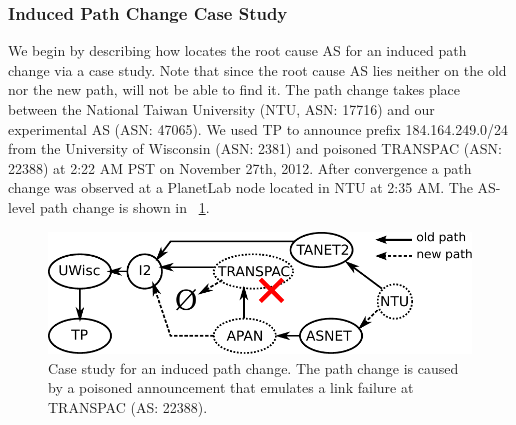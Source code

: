\subsubsection{Induced Path Change Case Study}

We begin by describing how \ouralgo locates the root cause AS for an induced path
change via a case study. Note that since the root cause AS lies neither on the old nor the 
new path,  \feldmann will not be able to find it. The path change takes place between the National Taiwan University
(NTU, ASN: 17716) and our experimental AS (ASN: 47065). We used TP to announce prefix
184.164.249.0/24 from the University of Wisconsin (ASN: 2381)
and poisoned TRANSPAC (ASN: 22388) at 2:22 AM PST on November 27th, 2012. After convergence a path change was observed at a PlanetLab node located in 
NTU at 2:35 AM. The AS-level path change is shown in \fig~\ref{fig:case-study}.

\begin{figure}[tb]
\centering\includegraphics[width=\columnwidth]{figs/case-study.pdf}
\vspace{-1.2em}
\caption{Case study for an induced path change. The path change is caused by
a poisoned announcement that emulates a link failure at TRANSPAC (AS: 22388).}
\label{fig:case-study}
\vspace{.7em}
\end{figure}

